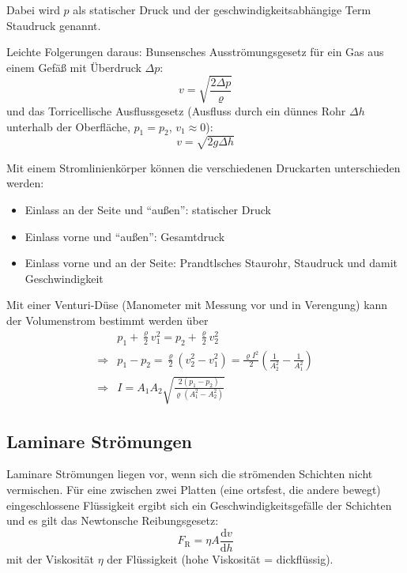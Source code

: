 \documentclass[a4paper]{scrartcl}
\begin{document}
Dabei wird $p$ als statischer Druck und der geschwindigkeitsabhängige Term Staudruck genannt.

Leichte Folgerungen daraus: Bunsensches Ausströmungsgesetz für ein Gas aus einem Gefäß mit Überdruck $\Delta p$:
\begin{equation*}
  v = \sqrt{\frac{2\Delta p}{\varrho}}
\end{equation*}
und das Torricellische Ausflussgesetz (Ausfluss durch ein dünnes Rohr $\Delta h$ unterhalb der Oberfläche, $p_1 = p_2$, $v_1 \approx 0$):
\begin{equation*}
  v = \sqrt{2g\Delta h}
\end{equation*}

Mit einem Stromlinienkörper können die verschiedenen Druckarten unterschieden werden:
\begin{itemize}[noitemsep]
  \item Einlass an der Seite und "`außen"': statischer Druck
  \item Einlass vorne und "`außen"': Gesamtdruck
  \item Einlass vorne und an der Seite: Prandtlsches Staurohr, Staudruck und damit Geschwindigkeit
\end{itemize}

Mit einer Venturi-Düse (Manometer mit Messung vor und in Verengung) kann der Volumenstrom bestimmt werden über
\begin{align*}
  & p_1 + \frac{\varrho}{2}v_1^2 = p_2 + \frac{\varrho}{2}v_2^2\\
  \Rightarrow & p_1 - p_2 = \frac{\varrho}{2}(v_2^2 - v_1^2) = \frac{\varrho I^2}{2}\left( \frac{1}{A_2^2} - \frac{1}{A_1^2} \right)\\
  \Rightarrow & I = A_1A_2\sqrt{\frac{2(p_1-p_2)}{\varrho(A_1^2-A_2^2)}}
\end{align*}


\subsection{Laminare Strömungen}
Laminare Strömungen liegen vor, wenn sich die strömenden Schichten nicht vermischen. Für eine zwischen zwei Platten (eine ortsfest, die andere bewegt) eingeschlossene Flüssigkeit ergibt sich ein Geschwindigkeitsgefälle der Schichten und es gilt das Newtonsche Reibungsgesetz:
\begin{equation*}
  F_\text{R} = \eta A \frac{\text{d}v}{\text{d}h}
\end{equation*}
mit der Viskosität $\eta$ der Flüssigkeit (hohe Viskosität = dickflüssig).
\end{document}
